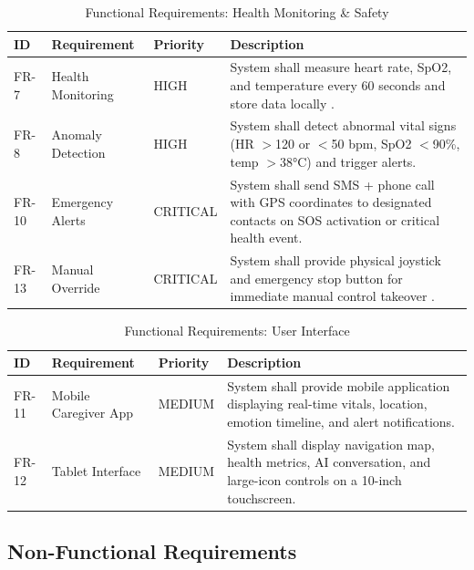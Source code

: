 \documentclass[12pt,a4paper]{report}
\renewcommand{\arraystretch}{1.45}
\renewcommand{\arraystretch}{1.3}
\begin{document}
\begin{table}[H]
\centering
\caption{Functional Requirements: Health Monitoring \& Safety}
\label{tab:fr_health}
{\renewcommand{\arraystretch}{1.6}
\begin{tabularx}{\textwidth}{@{}p{0.8cm}p{3.2cm}p{1.8cm}X@{}}
\toprule
\textbf{ID} & \textbf{Requirement} & \textbf{Priority} & \textbf{Description} \\
\midrule
FR-7  & Health Monitoring  & HIGH     & System shall measure heart rate, SpO2, and temperature every 60 seconds and store data locally \cite{sonekar_2024}. \\
\midrule
FR-8  & Anomaly Detection  & HIGH     & System shall detect abnormal vital signs (HR $>$120 or $<$50 bpm, SpO2 $<$90\%, temp $>$38°C) and trigger alerts. \\
\midrule

FR-10 & Emergency Alerts   & CRITICAL & System shall send SMS + phone call with GPS coordinates to designated contacts on SOS activation or critical health event. \\
\midrule
FR-13 & Manual Override    & CRITICAL & System shall provide physical joystick and emergency stop button for immediate manual control takeover \cite{iso13482}. \\
\bottomrule
\end{tabularx}}
\end{table}

\begin{table}[H]
\centering
\caption{Functional Requirements: User Interface}
\label{tab:fr_ui}
{\renewcommand{\arraystretch}{1.6}
\begin{tabularx}{\textwidth}{@{}p{0.8cm}p{3.2cm}p{1.8cm}X@{}}
\toprule
\textbf{ID} & \textbf{Requirement} & \textbf{Priority} & \textbf{Description} \\
\midrule
FR-11 & Mobile Caregiver App & MEDIUM & System shall provide mobile application displaying real-time vitals, location, emotion timeline, and alert notifications. \\
\midrule
FR-12 & Tablet Interface     & MEDIUM & System shall display navigation map, health metrics, AI conversation, and large-icon controls on a 10-inch touchscreen. \\
\bottomrule
\end{tabularx}}
\end{table}

\subsection{Non-Functional Requirements}
\end{document}
